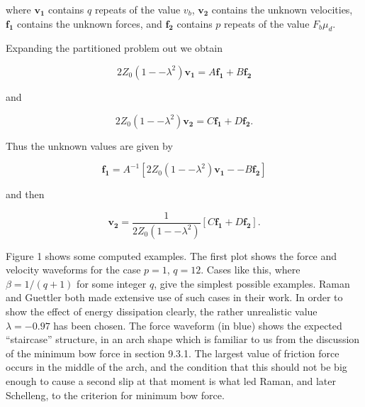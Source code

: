   \noindent{}where $\mathbf{v_1}$ contains $q$ repeats of the value $v_b$, 
  $\mathbf{v_2}$ contains the unknown velocities, $\mathbf{f_1}$ contains the 
  unknown forces, and $\mathbf{f_2}$ contains $p$ repeats of the value $F_b 
  \mu_d$. 

  Expanding the partitioned problem out we obtain 

  \begin{equation*}2 Z_0 (1 -- \lambda^2) \mathbf{v_1}=A 
  \mathbf{f_1}+B\mathbf{f_2} \tag{7}\end{equation*} 

  \noindent{}and 

  \begin{equation*}2 Z_0 (1 -- \lambda^2) \mathbf{v_2}=C 
  \mathbf{f_1}+D\mathbf{f_2} . \tag{8}\end{equation*} 

  Thus the unknown values are given by 

  \begin{equation*}\mathbf{f_1}=A^{-1} \left[ 2 Z_0 (1 -- \lambda^2) 
  \mathbf{v_1} -- B\mathbf{f_2} \right] \tag{9}\end{equation*} 

  \noindent{}and then 

  \begin{equation*}\mathbf{v_2}=\dfrac{1}{2 Z_0 (1 -- \lambda^2)} \left[C 
  \mathbf{f_1}+D\mathbf{f_2} \right] . \tag{10}\end{equation*} 

  Figure 1 shows some computed examples. The first plot shows the force and 
  velocity waveforms for the case $p=1$, $q=12$. Cases like this, where 
  $\beta=1/(q+1)$ for some integer $q$, give the simplest possible examples. 
  Raman and Guettler both made extensive use of such cases in their work. In 
  order to show the effect of energy dissipation clearly, the rather 
  unrealistic value $\lambda=-0.97$ has been chosen. The force waveform (in 
  blue) shows the expected ``staircase'' structure, in an arch shape which is 
  familiar to us from the discussion of the minimum bow force in section 9.3.1. 
  The largest value of friction force occurs in the middle of the arch, and the 
  condition that this should not be big enough to cause a second slip at that 
  moment is what led Raman, and later Schelleng, to the criterion for minimum 
  bow force. 



